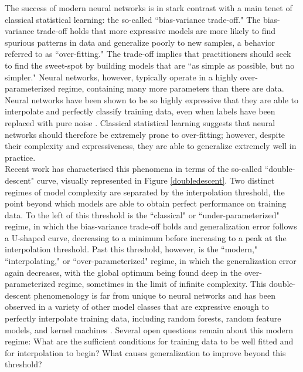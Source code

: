 \documentclass[11pt]{article}
\begin{document}
The success of modern neural networks is in stark contrast with a main tenet of classical statistical learning: the so-called ``bias-variance trade-off." The bias-variance trade-off holds that more expressive models are more likely to find spurious patterns in data and generalize poorly to new samples, a behavior referred to as ``over-fitting." The trade-off implies that practitioners should seek to find the sweet-spot by building models that are ``as simple as possible, but no simpler." Neural networks, however, typically operate in a highly over-parameterized regime, containing many more parameters than there are data. Neural networks have been shown to be so highly expressive that they are able to interpolate and perfectly classify training data, even when labels have been replaced with pure noise \cite{zhangUnderstandingDeepLearning2017}. Classical statistical learning suggests that neural networks should therefore be extremely prone to over-fitting; however, despite their complexity and expressiveness, they are able to generalize extremely well in practice.\\

Recent work \cite{belkinReconcilingModernMachine2019} has characterised this phenomena in terms of the so-called ``double-descent" curve, visually represented in Figure \ref{doubledescent}. Two distinct regimes of model complexity are separated by the interpolation threshold, the point beyond which models are able to obtain perfect performance on training data. To the left of this threshold is the ``classical" or ``under-parameterized" regime, in which the bias-variance trade-off holds and generalization error follows a U-shaped curve, decreasing to a minimum before increasing to a peak at the interpolation threshold. Past this threshold, however, is the ``modern," ``interpolating," or ``over-parameterized" regime, in which the generalization error again decreases, with the global optimum being found deep in the over-parameterized regime, sometimes in the limit of infinite complexity. This double-descent phenomenology is far from unique to neural networks and has been observed in a variety of other model classes that are expressive enough to perfectly interpolate training data, including random forests, random feature models, and kernel machines \cite{ belkinReconcilingModernMachine2019, belkinUnderstandDeepLearning2018}. Several open questions remain about this modern regime: What are the sufficient conditions for training data to be well fitted and for interpolation to begin? What causes generalization to improve beyond this threshold?
\end{document}
